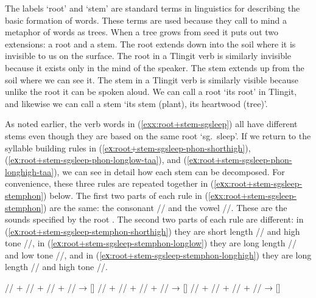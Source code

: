 The labels ‘root’ and ‘stem’ are standard terms in linguistics for describing the basic formation of words. These terms are used because they call to mind a metaphor of words as trees. When a tree grows from seed it puts out two extensions: a root and a stem. The root extends down into the soil where it is invisible to us on the surface. The root in a Tlingit verb is similarly invisible because it exists only in the mind of the speaker. The stem extends up from the soil where we can see it. The stem in a Tlingit verb is similarly visible because unlike the root it can be spoken aloud. We can call a root  ‘its root’ in Tlingit, and likewise we can call a stem  ‘its stem (plant), its heartwood (tree)’.

As noted earlier, the verb words in (\ref{exx:root+stem-sgsleep}) all have different stems even though they are based on the same root  ‘sg.\ sleep’. If we return to the syllable building rules in (\ref{eх:root+stem-sgsleep-phon-shorthigh}), (\ref{eх:root+stem-sgsleep-phon-longlow-taa}), and (\ref{eх:root+stem-sgsleep-phon-longhigh-taa}), we can see in detail how each stem can be decomposed. For convenience, these three rules are repeated together in (\ref{eхx:root+stem-sgsleep-stemphon}) below. The first two parts of each rule in (\ref{eхx:root+stem-sgsleep-stemphon}) are the same: the consonant // and the vowel //. These are the sounds specified by the root . The second two parts of each rule are different: in (\ref{eх:root+stem-sgsleep-stemphon-shorthigh}) they are short length // and high tone //, in (\ref{eх:root+stem-sgsleep-stemphon-longlow}) they are long length // and low tone //, and in (\ref{eх:root+stem-sgsleep-stemphon-longhigh}) they are long length // and high tone //.

\pex\label{eхx:root+stem-sgsleep-stemphon}%
\a\label{eх:root+stem-sgsleep-stemphon-shorthigh}%
%
	// + // + // + //
	→ []
\a\label{eх:root+stem-sgsleep-stemphon-longlow}%
%
	// + // + // + //
	→ []
\a\label{eх:root+stem-sgsleep-stemphon-longhigh}%
%
	// + // + // + //
	→ []
\xe

